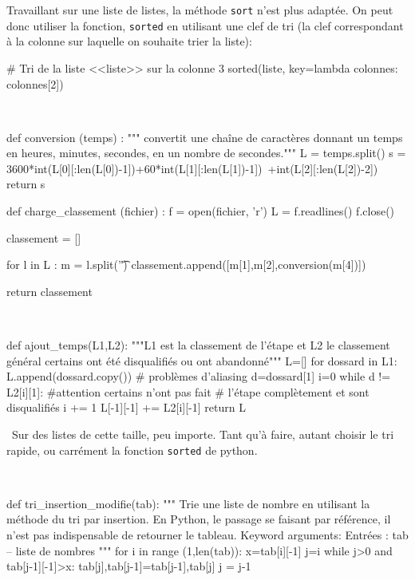 \begin{rem}
Travaillant sur une liste de listes, la méthode \texttt{sort} n'est plus adaptée. On peut donc utiliser la fonction, \texttt{sorted} en utilisant une clef de tri (la clef correspondant à la colonne sur laquelle on souhaite trier la liste): 
\end{rem}
\begin{python}
# Tri de la liste <<liste>> sur la colonne 3
sorted(liste, key=lambda colonnes: colonnes[2])
\end{python}



\fi


\ifprof
\begin{corrige}

\question\
\begin{python}
def conversion (temps) :
    """ convertit une chaîne de caractères donnant un temps en
    heures, minutes, secondes, en un nombre de secondes."""
    L = temps.split()
    s = 3600*int(L[0][:len(L[0])-1])+60*int(L[1][:len(L[1])-1])\
    +int(L[2][:len(L[2])-2])
    return s
    
def charge_classement (fichier) :
    f = open(fichier, 'r')
    L = f.readlines()
    f.close()

    classement = []

    for l in L :
        m = l.split('\t')
        classement.append([m[1],m[2],conversion(m[4])])

    return classement
\end{python}

\question\
\begin{python}
def ajout_temps(L1,L2):
    """L1 est la classement de l'étape et L2 le classement général
    certains ont été disqualifiés ou ont abandonné"""
    L=[]
    for dossard in L1:
        L.append(dossard.copy()) # problèmes d'aliasing
        d=dossard[1]
        i=0
        while d != L2[i][1]: #attention certains n'ont pas fait
            # l'étape complètement et sont disqualifiés
            i += 1
        L[-1][-1] += L2[i][-1]
    return L
\end{python}

\question\ Sur des listes de cette taille, peu importe. Tant qu'à faire, autant choisir le tri rapide, ou carrément la 
fonction \texttt{sorted} de python.

\question\ 
\begin{python}
def tri_insertion_modifie(tab):
    """ 
    Trie une liste de nombre en utilisant la méthode du tri par insertion.
    En Python, le passage se faisant par référence, il n'est pas indispensable
    de retourner le tableau.
    Keyword arguments:
    Entrées :
        tab -- liste de nombres
    """
    for i in range (1,len(tab)):
        x=tab[i][-1]
        j=i
        while j>0 and tab[j-1][-1]>x:
            tab[j],tab[j-1]=tab[j-1],tab[j]
            j = j-1
        

\end{python}
\end{corrige}
